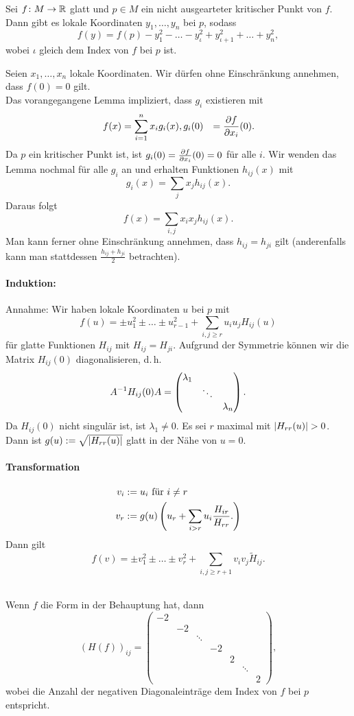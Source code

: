 Sei $f \colon M \overset{}{\rightarrow} \mathbb{R}$ glatt und $p \in M$ ein nicht ausgearteter kritischer Punkt von $f$. Dann gibt es lokale Koordinaten $y_1,\ldots, y_n$ bei $p$, sodass
\[ f(y) = f(p) - y_1^2 - \ldots - y_\iota^2 + y_{\iota+1}^2 + \ldots + y_n^2, \]
wobei $\iota$ gleich dem Index von $f$ bei $p$ ist.
\begin{Beweis}{}
Seien $x_1, \ldots, x_n$ lokale Koordinaten. Wir dürfen ohne Einschränkung annehmen, dass $f(0) = 0$ gilt.\\
Das vorangegangene Lemma impliziert, dass $g_i$ existieren mit
\begin{align*}
f(x) &= \sum_{i = 1}^n x_i g_i(x),
g_i(0) &= \frac{\partial f}{\partial x_i}(0).
\end{align*}
Da $p$ ein kritischer Punkt ist, ist $g_i(0) = \frac{\partial f}{\partial x_i}(0) = 0$ für alle $i$. Wir wenden das Lemma nochmal für alle $g_i$ an und erhalten Funktionen $h_{ij}(x)$ mit
\[ g_i(x) = \sum_j x_j h_{ij}(x). \]
Daraus folgt
\[ f(x) = \sum_{i,j} x_i x_j h_{ij}(x). \]
Man kann ferner ohne Einschränkung annehmen, dass $h_{ij} = h_{ji}$ gilt (anderenfalls kann man stattdessen $\frac{h_{ij} + h_{ji}}{2}$ betrachten).
\paragraph{Induktion:}
Annahme: Wir haben lokale Koordinaten $u$ bei $p$ mit
\[ f(u) = \pm u_1^2 \pm \ldots \pm u_{r-1}^2 + \sum_{i,j\geq r} u_i u_j H_{ij}(u) \]
für glatte Funktionen $H_{ij}$ mit $H_{ij} = H_{ji}$. Aufgrund der Symmetrie können wir die Matrix $H_{ij}(0)$ diagonalisieren, d.\,h.
\[ A^{-1} H_{ij}(0)A = \left(
\begin{matrix}
\lambda_1 \\
& \ddots \\
& & \lambda_n
\end{matrix}
\right). \]
Da $H_{ij}(0)$ nicht singulär ist, ist $\lambda_1 \neq 0$. Es sei $r$ maximal mit $\left|H_{rr}(u)\right| > 0$. Dann ist $g(u) := \sqrt{\left|H_{rr}(u)\right|}$ glatt in der Nähe von $u = 0$.\\
\paragraph{Transformation}
\begin{align*}
v_i &:= u_i \text{ für } i \neq r\\
v_r &:= g(u)\left(
u_r + \sum_{i > r}u_i \frac{H_{ir}}{H_{rr}}.
\right)
\end{align*}
Dann gilt
\[ f(v) = \pm v_1^2 \pm \ldots \pm v_r^2 + \sum_{i,j \geq r+ 1}v_i v_j \widetilde{H}_{ij}. \]
\end{Beweis}\\
Wenn $f$ die Form in der Behauptung hat, dann
\[ (H(f))_{ij} = \left(
\begin{matrix}
-2 \\
& -2\\
& & \ddots \\
& & & -2\\
& & & & 2 \\
& & & & & \ddots\\
& & & & & & 2
\end{matrix}
\right), \]
wobei die Anzahl der negativen Diagonaleinträge dem Index von $f$ bei $p$ entspricht.

